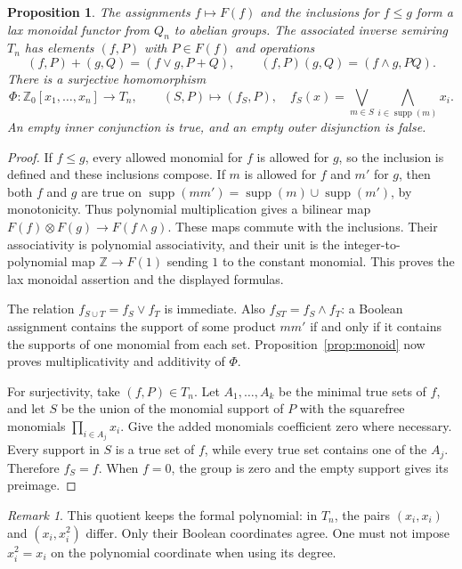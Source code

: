 \documentclass[11pt]{article}
\newcommand{\Z}{\mathbb Z}
\newcommand{\supp}{\operatorname{supp}}
\newtheorem{proposition}[theorem]{Proposition}
\theoremstyle{definition}
\theoremstyle{remark}
\newtheorem{remark}[theorem]{Remark}
\begin{document}
\begin{proposition}\label{prop:booleanpair}
The assignments $f\mapsto F(f)$ and the inclusions for $f\le g$ form a lax monoidal functor from $Q_n$ to abelian groups. The associated inverse semiring $T_n$ has elements $(f,P)$ with $P\in F(f)$ and operations
\[
 (f,P)+(g,Q)=(f\vee g,P+Q),\qquad
 (f,P)(g,Q)=(f\wedge g,PQ).
\]
There is a surjective homomorphism
\[
 \Phi:\Z_0[x_1,\ldots,x_n]\longrightarrow T_n,
 \qquad (S,P)\longmapsto(f_S,P),
 \quad
 f_S(x)=\bigvee_{m\in S}\bigwedge_{i\in\supp(m)}x_i.
\]
An empty inner conjunction is true, and an empty outer disjunction is false.
\end{proposition}
\begin{proof}
If $f\le g$, every allowed monomial for $f$ is allowed for $g$, so the inclusion is defined and these inclusions compose. If $m$ is allowed for $f$ and $m'$ for $g$, then both $f$ and $g$ are true on $\supp(mm')=\supp(m)\cup\supp(m')$, by monotonicity. Thus polynomial multiplication gives a bilinear map $F(f)\otimes F(g)\to F(f\wedge g)$. These maps commute with the inclusions. Their associativity is polynomial associativity, and their unit is the integer-to-polynomial map $\Z\to F(1)$ sending $1$ to the constant monomial. This proves the lax monoidal assertion and the displayed formulas.

The relation $f_{S\cup T}=f_S\vee f_T$ is immediate. Also $f_{ST}=f_S\wedge f_T$: a Boolean assignment contains the support of some product $mm'$ if and only if it contains the supports of one monomial from each set. Proposition~\ref{prop:monoid} now proves multiplicativity and additivity of $\Phi$.

For surjectivity, take $(f,P)\in T_n$. Let $A_1,\ldots,A_k$ be the minimal true sets of $f$, and let $S$ be the union of the monomial support of $P$ with the squarefree monomials $\prod_{i\in A_j}x_i$. Give the added monomials coefficient zero where necessary. Every support in $S$ is a true set of $f$, while every true set contains one of the $A_j$. Therefore $f_S=f$. When $f=0$, the group is zero and the empty support gives its preimage.
\end{proof}

\begin{remark}
This quotient keeps the formal polynomial: in $T_n$, the pairs $(x_i,x_i)$ and $(x_i,x_i^2)$ differ. Only their Boolean coordinates agree. One must not impose $x_i^2=x_i$ on the polynomial coordinate when using its degree.
\end{remark}
\end{document}
